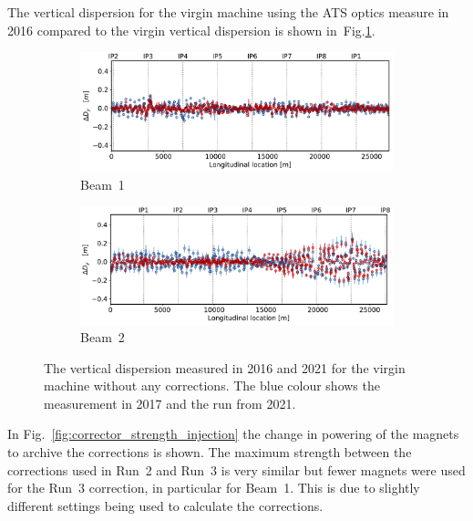 \documentclass[a4paper]{cernatsnote}
\begin{document}
The vertical dispersion for the virgin machine using the ATS optics measure in 2016 compared to the virgin vertical dispersion is shown in~Fig.\ref{fig:2016_disp_vs_2021_vertical}. 
\begin{figure}[ht]
\begin{subfigure}{.5\textwidth}
  \centering
  \includegraphics[width=.99\linewidth]{plots/beam1/vertical_disp_virgin_beam1.pdf.pdf} 
  \caption{Beam~1}
\end{subfigure}
\begin{subfigure}{.5\textwidth}
  \centering
  \includegraphics[width=.99\linewidth]{plots/beam2/vertical_disp_virgin_beam2.pdf.pdf} 
  \caption{Beam~2}
\end{subfigure}
\caption{The vertical dispersion measured in 2016 and 2021 for the virgin machine without any corrections. The blue colour shows the measurement in 2017 and the run from 2021. }
\label{fig:2016_disp_vs_2021_vertical}
\end{figure}

In Fig.~\ref{fig:corrector_strength_injection} the change in powering of the magnets to archive the corrections is shown. The maximum strength between the corrections used in Run~2 and Run~3 is very similar but fewer magnets were used for the Run~3 correction, in particular for Beam~1. This is due to slightly different settings being used to calculate the corrections.  
\end{document}
